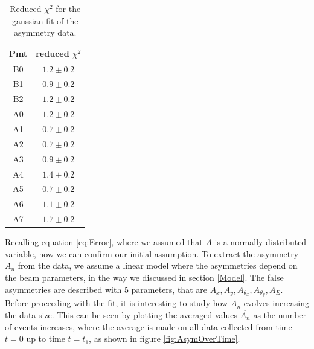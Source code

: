 \begin{table}[!ht]
\centering
\begin{tabular}{c|c}
\hline 
Pmt & reduced $\chi^{2}$ \\ 
\hline
B0 & $1.2 \pm 0.2$ \\ 
B1 & $0.9 \pm 0.2$ \\ 
B2 & $1.2 \pm 0.2$ \\
A0 & $1.2 \pm 0.2$ \\ 
A1 & $0.7 \pm 0.2$ \\ 
A2 & $0.7 \pm 0.2$ \\ 
A3 & $0.9 \pm 0.2$ \\ 
A4 & $1.4 \pm 0.2$ \\ 
A5 & $0.7 \pm 0.2$ \\ 
A6 & $1.1 \pm 0.2$ \\ 
A7 & $1.7 \pm 0.2$ \\ 
\hline 
\end{tabular}
\caption{Reduced $\chi^{2}$ for the gaussian fit of the asymmetry data.} 
\label{tab:Chisq}
\end{table}

Recalling equation \ref{eq:Error}, where we assumed that $A$ is a normally distributed variable, now we can confirm our initial assumption. To extract the asymmetry $A_{n}$ from the data, we assume a linear model where the asymmetries depend on the beam parameters, in the way we discussed in section \ref{Model}. The false asymmetries are described with 5 parameters, that are  $A_{x},A_{y},A_{\theta_{x}},A_{\theta_{y}},A_{E}$.
\newpage
Before proceeding with the fit, it is interesting to study how $A_{n}$ evolves increasing the data size. This can be seen by plotting the averaged values $\overline{A_{n}}$ as the number of events increases, where the average is made on all data collected from time $t = 0$ up to time $t = t_{1}$, as shown in figure \ref{fig:AsymOverTime}. 

